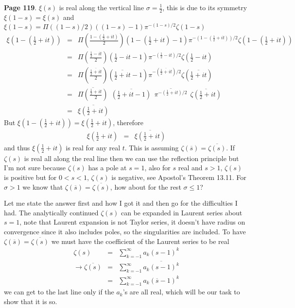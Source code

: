 \documentclass[aps,preprint,preprintnumbers,nofootinbib,showpacs,prd]{revtex4-1}
\newcommand{\nbea}{\begin{eqnarray*}}
\newcommand{\neea}{\end{eqnarray*}}
\begin{document}
{\bf Page 119}. $\xi(s)$ is real along the vertical line $\sigma = \frac{1}{2}$, this is due to its symmetry $\xi(1-s) = \xi(s)$ and $\xi(1-s) = \Pi((1-s)/2)((1-s)-1)\pi^{-(1-s)/2}\zeta(1-s)$
%
\nbea
\xi\left(1 - \left(\frac{1}{2} + it\right)\right) & = & \Pi\left(\frac{1 - (\frac{1}{2} + it)}{2}\right)\left(1 - \left(\frac{1}{2} + it\right)-1\right)\pi^{-\left(1 - \left(\frac{1}{2} + it\right)\right)/2}\zeta\left(1 - \left(\frac{1}{2} + it\right)\right) \\
& = & \Pi\left(\frac{\frac{1}{2} - it}{2}\right)\left(\frac{1}{2} - it -1\right)\pi^{-\left(\frac{1}{2} - it\right)/2}\zeta\left(\frac{1}{2} - it\right) \\
& = & \Pi\left(\frac{\overline{\frac{1}{2} + it}}{2}\right)\left(\overline{\frac{1}{2} + it} -1\right)\pi^{-\left(\overline{\frac{1}{2} + it}\right)/2}\zeta\left(\overline{\frac{1}{2} + it}\right) \\
& = & \overline{\Pi\left(\frac{\frac{1}{2} + it}{2}\right)}  ~~\overline{\left(\frac{1}{2} + it -1\right)} ~~\overline{\pi^{-\left(\frac{1}{2} + it\right)/2}} ~~  \overline{\zeta\left(\frac{1}{2} + it\right)} \\
& = & \overline{\xi\left(\frac{1}{2} + it\right)}
\neea
%
But $\xi\left(1 - \left(\frac{1}{2} + it\right)\right) = \xi\left(\frac{1}{2} + it\right)$, therefore
%
\nbea
\xi\left(\frac{1}{2} + it\right) & = & \overline{\xi\left(\frac{1}{2} + it\right)}
\neea
%
and thus $\xi\left(\frac{1}{2} + it\right)$ is real for any real $t$. This is assuming $\zeta(\overline{s}) = \overline{\zeta(s)}$. If $\zeta(s)$ is real all along the real line then we can use the reflection principle but I'm not sure because $\zeta(s)$ has a pole at $s=1$, also for $s$ real and $s> 1$, $\zeta(s)$ is positive but for $0 < s < 1$, $\zeta(s)$ is negative, see Apostol's Theorem 13.11. For $\sigma > 1$ we know that $\zeta(\overline{s}) = \overline{\zeta(s)}$, how about for the rest $\sigma \le 1$?

Let me state the answer first and how I got it and then go for the difficulties I had. The analytically continued $\zeta(s)$ can be expanded in Laurent series about $s=1$, note that Laurent expansion is not Taylor series, it doesn't have radius on convergence since it also includes poles, so the singularities are included. To have $\zeta(\overline{s}) = \overline{\zeta(s)}$ we must have the coefficient of the Laurent series to be real
%
\nbea
\zeta(s) & = & \sum_{k=-1}^\infty a_k (s-1)^k \\
\to \overline{\zeta(s)} & = & \sum_{k=-1}^\infty \overline{a_k (s-1)^k} \\
& = & \sum_{k=-1}^\infty a_k (\overline{s}-1)^k
\neea
%
we can get to the last line only if the $a_k$'s are all real, which will be our task to show that it is so.
\end{document}
